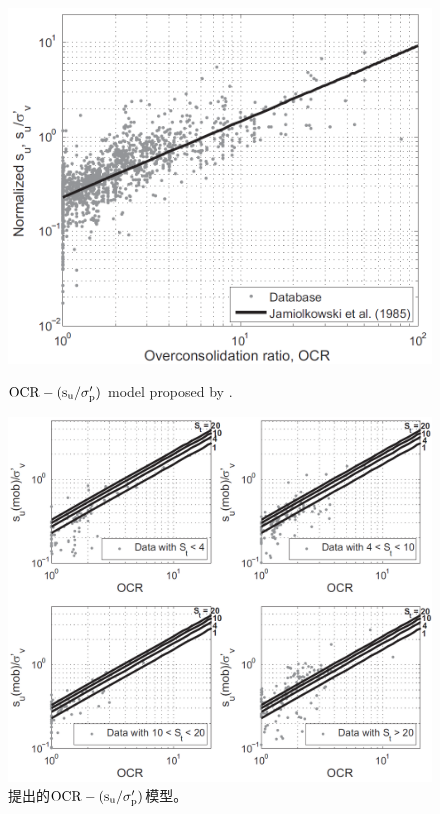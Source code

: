 \begin{figure}[!p]
    \centering
    \begin{minipage}[t]{0.48\textwidth}
        \centering
        \includegraphics[width=\textwidth]{figures/figure-10.png}
        \caption{$\rm{OCR}-(s_u/\sigma_p')$ model proposed by \citet{Jamiolkowski198557}.}
        \vspace{-5pt}
        \addtocounter{figure}{-1}
        \renewcommand{\figurename}{图}
        \caption{\citet{Jamiolkowski198557}提出的$\rm{OCR}-(s_u/\sigma_p')$模型。}
        \label{figure:10}
        \renewcommand{\figurename}{Figure}
    \end{minipage}
    \begin{minipage}[t]{0.48\textwidth}
        \centering
        \includegraphics[width=\textwidth]{figures/figure-11.png}

\end{minipage}
\end{figure}
